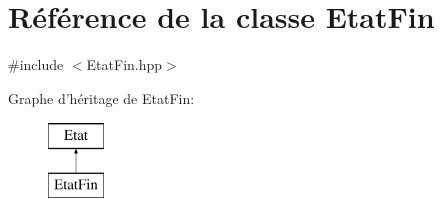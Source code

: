 \hypertarget{class_etat_fin}{\section{Référence de la classe Etat\-Fin}
\label{class_etat_fin}
}


{\ttfamily \#include $<$Etat\-Fin.\-hpp$>$}

Graphe d'héritage de Etat\-Fin\-:\begin{figure}[H]
\begin{center}
\leavevmode
\includegraphics[height=2.000000cm]{class_etat_fin}
\end{center}
\end{figure}
